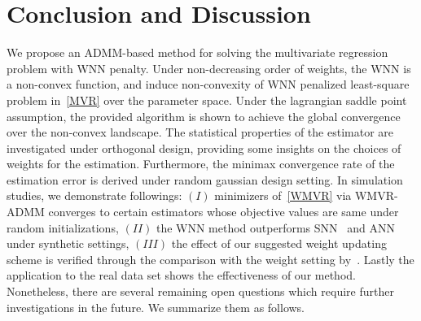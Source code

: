 \documentclass[alpha-refs]{wiley-article}
\begin{document}
\section{Conclusion and Discussion} \label{Disc}
We propose an ADMM-based method for solving the multivariate regression problem with WNN penalty.
Under non-decreasing order of weights, the WNN is a non-convex function, and induce non-convexity of WNN penalized least-square 
problem in~\eqref{MVR} over the parameter space.
Under the lagrangian saddle point assumption, the provided algorithm is shown to achieve the global convergence over the non-convex landscape.
The statistical properties of the estimator are investigated under orthogonal design, providing some insights on the choices of weights for the estimation.
Furthermore, the minimax convergence rate of the estimation error is derived under random gaussian design setting.
In simulation studies, we demonstrate followings: 
$(I)$  minimizers of~\eqref{WMVR} via WMVR-ADMM converges to certain estimators whose objective values are same under random initializations,
$(II)$ the WNN method outperforms SNN~\citep{yuan2007dimension} and ANN~\citep{chen2013reduced} under synthetic settings,
$(III)$ the effect of our suggested weight updating scheme is verified through the comparison with the weight setting by~\citet{chen2013reduced}.
Lastly the application to the real data set shows the effectiveness of our method. 
Nonetheless, there are several remaining open questions which require further investigations in the future.
We summarize them as follows.
\end{document}
